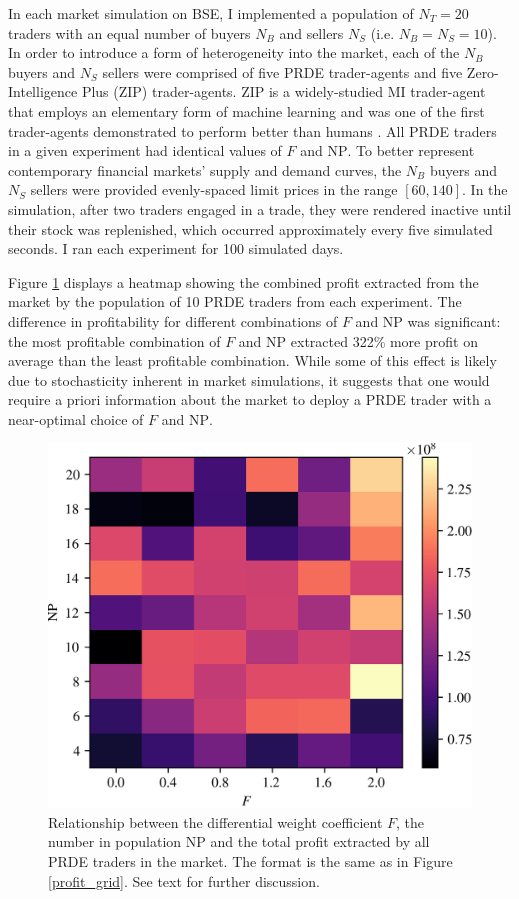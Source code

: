 \documentclass[a4paper,twoside]{article}
\begin{document}
In each market simulation on BSE, I implemented a population of $N_T=20$ traders with an equal number of buyers $N_B$ and sellers $N_S$ (i.e. $N_B=N_S=10$).
In order to introduce a form of heterogeneity into the market, each of the $N_B$ buyers and $N_S$ sellers were comprised of five PRDE trader-agents and five Zero-Intelligence Plus (ZIP) \cite{ZIP} trader-agents.
ZIP is a widely-studied MI trader-agent that employs an elementary form of machine learning and was one of the first trader-agents demonstrated to perform better than humans \cite{DasHansonKephartTesauro}.
All PRDE traders in a given experiment had identical values of $F$ and $\mathrm{NP}$.
To better represent contemporary financial markets' supply and demand curves, the $N_B$ buyers and $N_S$ sellers were provided evenly-spaced limit prices in the range $[60, 140]$.
In the simulation, after two traders engaged in a trade, they were rendered inactive until their stock was replenished, which occurred approximately every five simulated seconds.
I ran each experiment for 100 simulated days.

Figure \ref{zip_profit_grid} displays a heatmap showing the combined profit extracted from the market by the population of 10 PRDE traders from each experiment.
The difference in profitability for different combinations of $F$ and $\mathrm{NP}$ was significant: the most profitable combination of $F$ and $\mathrm{NP}$ extracted 322\% more profit on average than the least profitable combination.
While some of this effect is likely due to stochasticity inherent in market simulations, it suggests that one would require a priori information about the market to deploy a PRDE trader with a near-optimal choice of $F$ and $\mathrm{NP}$.

\begin{figure}[htbp]
    \centerline{\includegraphics[width=\columnwidth]{zip_profit_grid.png}}
    \caption{
        Relationship between the differential weight coefficient $F$, the number in population $\mathrm{NP}$ and the total profit extracted by all PRDE traders in the market.
        The format is the same as in Figure \ref{profit_grid}.
        See text for further discussion.
    }
    \label{zip_profit_grid}
\end{figure}
\end{document}
